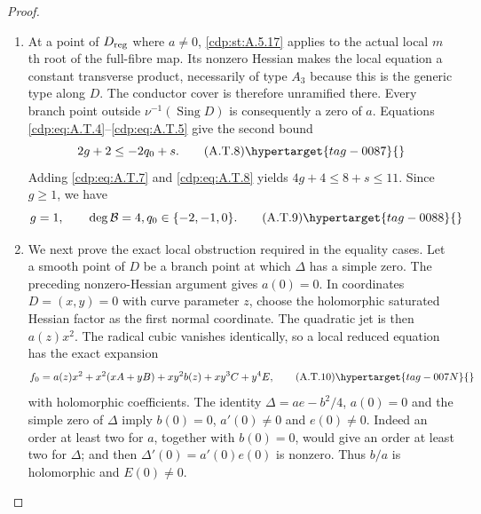 \begin{proof}
\begin{enumerate}[label={$\langle1\rangle$\arabic*.},leftmargin=*]
\item At a point of $D_{\rm reg}$ where $a\ne0$, \ref{cdp:st:A.5.17}
applies to the actual local $m$th root of the full-fibre
map. Its nonzero Hessian makes the local equation a
constant transverse product, necessarily of type
$A_3$ because this is the generic type along $D$.
The conductor cover is therefore unramified there.
Every branch point outside $\nu^{-1}(\operatorname{Sing}D)$
is consequently a zero of $a$. Equations \eqref{cdp:eq:A.T.4}--\eqref{cdp:eq:A.T.5}
give the second bound
\[
                    2g+2\le -2q_0+s.              \tag{A.T.8}\hypertarget{tag-0087}{}\label{cdp:eq:A.T.8}
\]
Adding \eqref{cdp:eq:A.T.7} and \eqref{cdp:eq:A.T.8} yields
$4g+4\le8+s\le11$. Since $g\ge1$, we have
\[
           g=1,\qquad \deg\mathcal B=4,
                    q_0\in\{-2,-1,0\}.            \tag{A.T.9}\hypertarget{tag-0088}{}\label{cdp:eq:A.T.9}
\]

\item We next prove the exact local obstruction required in
the equality cases. Let a smooth point of $D$ be a
branch point at which $\Delta$ has a simple zero.
The preceding nonzero-Hessian argument gives $a(0)=0$.
In coordinates $D=(x,y)=0$ with curve parameter $z$,
choose the holomorphic saturated Hessian factor as the
first normal coordinate. The quadratic jet is then
$a(z)x^2$. The radical cubic vanishes identically,
so a local reduced equation has the exact expansion
\[
 f_0=a(z)x^2+x^2(xA+yB)+xy^2b(z)+xy^3C+y^4E,
                                                        \tag{A.T.10}\hypertarget{tag-007N}{}\label{cdp:eq:A.T.10}
\]
with holomorphic coefficients. The identity
$\Delta=ae-b^2/4$, $a(0)=0$ and the simple zero of
$\Delta$ imply $b(0)=0$, $a'(0)\ne0$ and $e(0)\ne0$.
Indeed an order at least two for $a$, together with
$b(0)=0$, would give an order at least two for $\Delta$;
and then $\Delta'(0)=a'(0)e(0)$ is nonzero.
Thus $b/a$ is holomorphic and $E(0)\ne0$.


\end{enumerate}
\end{proof}
